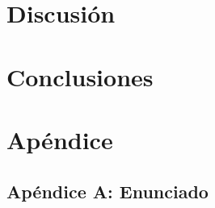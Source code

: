 \documentclass[10pt, a4paper,english,spanish]{article}
\begin{document}
\section{Discusión}

\clearpage

\section{Conclusiones}


\section{Apéndice}
\subsection{Apéndice A: Enunciado}
% 
\end{document}
